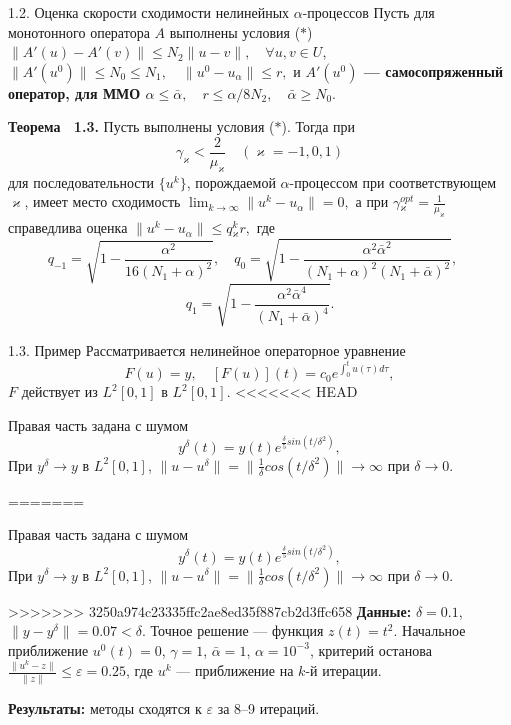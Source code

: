 \documentclass[10pt,pdf, mathserif, hyperref={unicode}]{beamer}
\begin{document}
\begin{frame}{\small 1.2. Оценка скорости сходимости нелинейных $\alpha$-процессов}
		Пусть для монотонного оператора $A$ выполнены условия ($*$) $\|A'(u)-A'(v)\|\leqslant N_2\|u-v\|, \quad \forall u, v \in U$,	$\|A'(u^0)\| \leqslant N_0\leqslant N_1, \quad \|u^0-u_\alpha\| \leqslant r,$ и {\textbf{\color{blue}$A'(u^0)$ --- самосопряженный оператор, для ММО $\alpha \leqslant \bar\alpha, \quad r\leqslant \alpha/8N_2, \quad \bar\alpha \geqslant N_0.$}}
	\begin{block}{\bf Теорема ~1.3.}
		Пусть выполнены условия ($*$). Тогда при
		$$\gamma _\varkappa <\frac{2}{\mu _\varkappa}\quad (\varkappa=-1,0,1)$$
		для последовательности $\{u^k\}$, порождаемой $\alpha$-процессом при соответствующем $\varkappa$, имеет место сходимость $\lim_{k\to\infty}\|u^k-u_\alpha\|=0, $ а при 
		$\gamma{_\varkappa^{opt}}=\frac{1}{\mu_\varkappa}$
		справедлива оценка $\|u^k-u_\alpha\|\leqslant q{_\varkappa^k}r,$ где
		$$
		q_{-1}=\sqrt{1-\frac{\alpha^2}{16(N_1+\alpha)^2}}, \quad q_0=\sqrt{1-\frac{\alpha^2\bar\alpha^2}{(N_1+\alpha)^2(N_1+\bar\alpha)^2}}, \quad $$$$q_1=\sqrt{1-\frac{\alpha^2\bar\alpha^4}{(N_1+\bar\alpha)^4}}.
		$$
	\end{block}
\end{frame}
\begin{frame}{1.3. Пример}
Рассматривается нелинейное операторное уравнение
	$$	F(u)=y, \quad [F(u)](t)=c_0 e^{\int_{0}^{t}u(\tau)d\tau},$$
	$F$ действует из $L^2[0,1]$ в $L^2[0,1]$. 
<<<<<<< HEAD
	
	Правая часть задана с шумом $$y^\delta(t)=y(t)e^{\frac{\delta}{5} sin(t/{\delta}^2)},$$
	При $y^\delta\to y$ в $L^2[0,1]$,  $\|u-u^\delta\|=\|\frac{1}{\delta}cos(t/{\delta}^2)\|\to\infty$ при $\delta\to 0$.
	
=======
	
	Правая часть задана с шумом $$y^\delta(t)=y(t)e^{\frac{\delta}{5} sin(t/{\delta}^2)},$$
	При $y^\delta\to y$ в $L^2[0,1]$,  $\|u-u^\delta\|=\|\frac{1}{\delta}cos(t/{\delta}^2)\|\to\infty$ при $\delta\to 0$.
	
>>>>>>> 3250a974c23335ffc2ae8ed35f887cb2d3ffc658
	{\textbf{\color{blue}Данные:}} $\delta=0.1$, $\|y-y^{\delta}\|=0.07<\delta$. Точное решение --- функция $z(t)=t^2$. Начальное приближение $u^0(t)=0$, $\gamma=1$, $\bar\alpha=1$, $\alpha=10^{-3}$, критерий останова $\frac{\|u^k-z\|}{\|z\|}\leqslant\varepsilon=0.25$, где $u^k$ --- приближение на $k$-й итерации.
	
	{\textbf{\color{blue}Результаты:}} методы сходятся к $\varepsilon$ за 8--9 итераций.

	\let\thefootnote\relax\let\thefootnote\relax{}
\end{frame}
\end{document}
